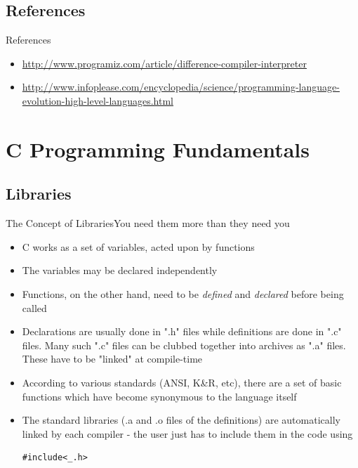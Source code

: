 \documentclass{beamer}
\begin{document}
\subsection*{References}
\begin{frame}{References}
\begin{itemize}
\item \url{http://www.programiz.com/article/difference-compiler-interpreter}
\item \url{http://www.infoplease.com/encyclopedia/science/programming-language-evolution-high-level-languages.html}
\end{itemize}
\end{frame}

\section{C Programming Fundamentals}
\subsection{Libraries}
\begin{frame}[fragile]{The Concept of Libraries}{You need them more than they need you}
\begin{itemize}
\item C works as a set of variables, acted upon by functions
\item The variables may be declared independently
\item Functions, on the other hand, need to be \emph{defined} and \emph{declared} before being called
\item Declarations are usually done in ".h" files while definitions are done in ".c" files. Many such ".c" files can be clubbed together into archives as ".a" files. These have to be "linked" at compile-time
\item According to various standards (ANSI, K\&R, etc), there are a set of basic functions which have become synonymous to the language itself
\item The standard libraries (.a and .o files of the definitions) are automatically linked by each compiler - the user just has to include them in the code using
\begin{center}
\begin{verbatim}
#include<_.h>
\end{verbatim}
\end{center}
\end{itemize}
\end{frame}
\end{document}
